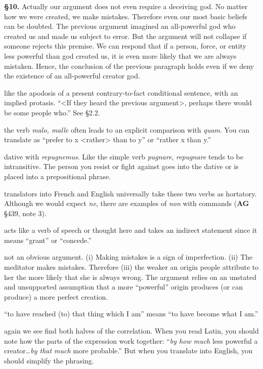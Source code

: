 \prenotes

\textbf{§10.} Actually our argument does not even require a deceiving god. No matter how we were created, we make mistakes. Therefore even our most basic beliefs can be doubted. The previous argument imagined an all-powerful god who created us and made us subject to error. But the argument will not collapse if someone rejects this premise. We can respond that if a person, force, or entity less powerful than god created us, it is even more likely that we are always mistaken. Hence, the conclusion of the previous paragraph holds even if we deny the existence of an all-powerful creator god.

 like the apodosis of a present contrary-to-fact conditional sentence, with an implied protasis. ``<If they heard the previous argument>, perhaps there would be some people who.'' See §2.2.

 the verb \textit{malo, malle} often leads to an explicit comparison with \textit{quam}. You can translate as ``prefer to x <rather> than to y'' or ``rather x than y.''

 dative with \textit{repugnemus}. Like the simple verb \textit{pugnare}, \textit{repugnare} tends to be intransitive. The person you resist or fight against goes into the dative or is placed into a prepositional phrase.

 translators into French and English universally take these two verbs as hortatory. Although we would expect \textit{ne}, there are examples of \textit{non} with commands (\textbf{AG} §439, note 3).

 acts like a verb of speech or thought here and takes an indirect statement since it means ``grant'' or ``concede.''

 not an obvious argument. (i) Making mistakes is a sign of imperfection. (ii) The meditator makes mistakes. Therefore (iii) the weaker an origin people attribute to her the more likely that she is always wrong. The argument relies on an unstated and unsupported assumption that a more ``powerful'' origin produces (or can produce) a more perfect creation.

 ``to have reached (to) that thing which I am'' means ``to have become what I am.''

 again we see find both halves of the correlation.  When you read Latin, you should note how the parts of the expression work together: ``\textit{by how much} less powerful a creator\dots \textit{by that much} more probable.'' But when you translate into English, you should simplify the phrasing.

